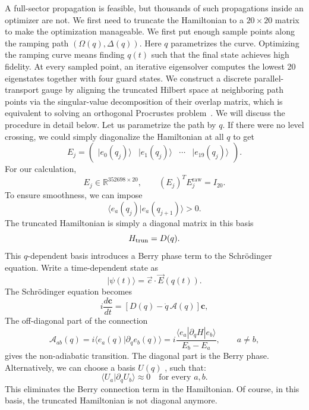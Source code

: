 \documentclass[a4paper,11pt]{article}
\theoremstyle{remark}
\theoremstyle{theorem}
\begin{document}
A full-sector propagation is feasible, but thousands of such propagations inside an optimizer are not. We first need to truncate the Hamiltonian to a $20\times 20$ matrix to make the optimization manageable.
We first put enough sample points along the ramping path $(\Omega(q), \Delta(q))$. Here $q$ parametrizes the curve. Optimizing the ramping curve means finding $q(t)$ such that the final state achieves high fidelity.
 At every sampled point, an iterative eigensolver computes the lowest 20 eigenstates together with four guard states.
 We construct a discrete parallel-transport gauge by aligning the truncated Hilbert space at neighboring path points via the singular-value decomposition of their overlap matrix, which is equivalent to solving an orthogonal Procrustes problem~\cite{Kato1950,Schonemann1966,LiuVanderbilt2015}. We will discuss the procedure in detail below.
Let us parametrize the path by $q$. If there were no level crossing, we could simply diagonalize the Hamiltonian at all $q$ to get 
$$
E_j^{}
=
\begin{pmatrix}
|e_0(q_j)\rangle&
|e_1(q_j)\rangle&
\cdots&
|e_{19}(q_j)\rangle
\end{pmatrix}.
$$
For our calculation,
\[
E_j^{}\in\mathbb R^{352698\times20},
\qquad
(E_j^{})^T E_j^{\mathrm{raw}}=I_{20}.
\]
To ensure smoothness, we can impose 
$$
\langle e_a(q_j)|e_a(q_{j+1})\rangle>0.
$$
The truncated Hamiltonian is simply a diagonal matrix in this basis
$$
H_{\rm trun} = D(q).
$$
This $q$-dependent basis introduces a Berry phase term to the Schrödinger equation. Write a time-dependent state as
$$
|\psi(t)\rangle =\vec{c} \cdot \vec{E}(q(t)) .
$$
The Schrödinger equation becomes
$$
i\frac{d\mathbf c}{dt}
=
\left[
D(q)-\dot q\,\mathcal A(q)
\right]\mathbf c,
$$
The off-diagonal part of the connection 
\[
\mathcal A_{ab}(q)
=
i\langle e_a(q)|\partial_q e_b(q)\rangle
=
i\frac{\langle e_a|\partial_qH|e_b\rangle}
{E_b-E_a},
\qquad a\neq b,
\]
gives the non-adiabatic transition. 
The diagonal part is the Berry phase. Alternatively, we can choose a basis \(U(q) \) , such that:
$$
{\langle U_a|\partial_qU_b\rangle\approx0
\quad\text{for every }a,b.}
$$
This eliminates the Berry connection term in the Hamiltonian. Of course, in this basis, the truncated Hamiltonian is not diagonal anymore.
\end{document}
